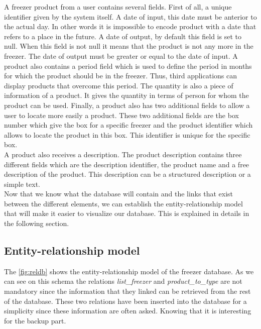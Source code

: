 A freezer product from a user contains several fields. First of all, a unique identifier given by the system itself. A date of input, this date must be anterior to the actual day. In other words it is impossible to encode product with a date that refers to a place in the future. A date of output, by default this field is set to null. When this field is not null it means that the product is not any more in the freezer. The date of output must be greater or equal to the date of input. A product also contains a period field which is used to define the period in months for which the product should be in the freezer. Thus, third applications can display products that overcome this period. The quantity is also a piece of information of a product. It gives  the quantity in terms of person for whom the product can be used. Finally, a product also has two additional fields to allow a user to locate more easily a product. These two additional fields are the box number which give the box for a specific freezer and the product identifier which allows to locate the product in this box. This identifier is unique for the specific box.\\

A product also receives a description. The product description contains three different fields which are the description identifier, the product name and a free description of the product. This description can be a structured description or a simple text. \\

Now that we know what the database will contain and the links that exist between the different elements, we can establish the entity-relationship model that will make it easier to visualize our database. This is explained in details in the following section.

\subsection{Entity-relationship model}
The \autoref{fig:reldb} shows the entity-relationship model of the freezer database. As we can see on this schema the relations \textit{list\_freezer} and \textit{product\_to\_type} are not mandatory since the information that they linked can be retrieved from the rest of the database. These two relations have been inserted into the database for a simplicity since these information are often asked. Knowing that it is interesting for the backup part. \\

